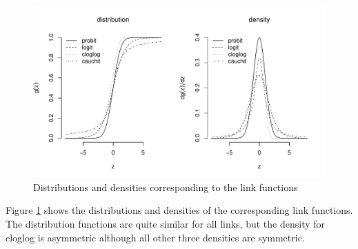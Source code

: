 \begin{figure}
\centering
\includegraphics[width = \textwidth]{figures/binomiallinkfunctions.pdf}
\caption{Distributions and densities corresponding to the link functions}\label{fig::links-cdf=pdf}
\end{figure}

Figure \ref{fig::links-cdf=pdf} shows the distributions and densities of the corresponding link functions. The distribution functions are quite similar for all links, but the density for cloglog is asymmetric although all other three densities are symmetric. 



